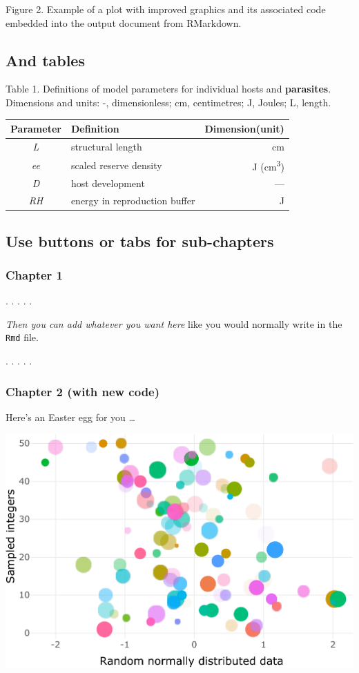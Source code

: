 \documentclass[article]{article}
\begin{document}
Figure 2. Example of a plot with improved graphics and its associated
code embedded into the output document from RMarkdown.

\newpage

\subsection{And tables}\label{and-tables}

Table 1. Definitions of model parameters for individual hosts and
\textbf{parasites}. Dimensions and units: -, dimensionless; cm,
centimetres; J, Joules; L, length.

\begin{longtable}[]{@{}clr@{}}
\toprule
Parameter & Definition & Dimension(unit)\tabularnewline
\midrule
\endhead
\emph{L} & structural length & cm\tabularnewline
\emph{ee} & scaled reserve density & J
(cm\textsuperscript{3})\tabularnewline
\emph{D} & host development & ---\tabularnewline
\emph{RH} & energy in reproduction buffer & J\tabularnewline
\bottomrule
\end{longtable}

\newpage

\subsection{Use buttons or tabs for
sub-chapters}\label{use-buttons-or-tabs-for-sub-chapters}

\subsubsection{Chapter 1}\label{chapter-1}

. . . . .

\emph{Then you can add whatever you want here} like you would normally
write in the \texttt{Rmd} file.

. . . . .

\subsubsection{Chapter 2 (with new code)}\label{chapter-2-with-new-code}

Here's an Easter egg for you \ldots{}

\includegraphics{Lesson5_rmd_files/figure-latex/unnamed-chunk-3-1.pdf}
\end{document}
